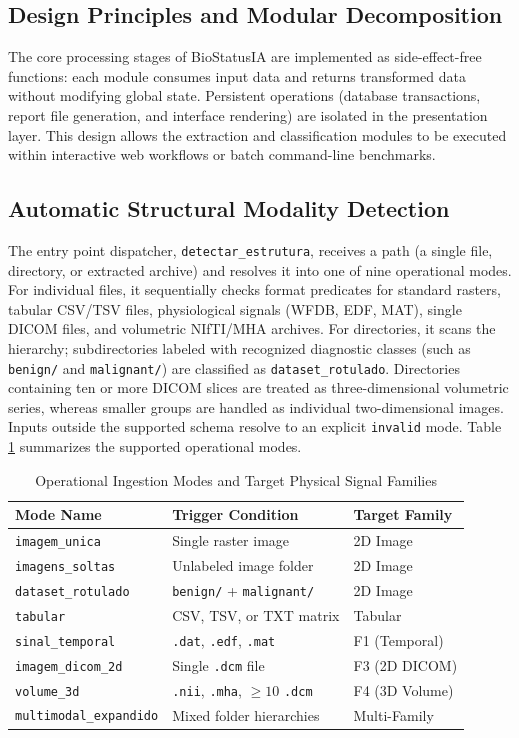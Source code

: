 \documentclass[conference]{IEEEtran}
\begin{document}
\subsection{Design Principles and Modular Decomposition}
The core processing stages of BioStatusIA are implemented as side-effect-free functions: each module consumes input data and returns transformed data without modifying global state. Persistent operations (database transactions, report file generation, and interface rendering) are isolated in the presentation layer. This design allows the extraction and classification modules to be executed within interactive web workflows or batch command-line benchmarks.

\subsection{Automatic Structural Modality Detection}
The entry point dispatcher, \texttt{detectar\_estrutura}, receives a path (a single file, directory, or extracted archive) and resolves it into one of nine operational modes. For individual files, it sequentially checks format predicates for standard rasters, tabular CSV/TSV files, physiological signals (WFDB, EDF, MAT), single DICOM files, and volumetric NIfTI/MHA archives. For directories, it scans the hierarchy; subdirectories labeled with recognized diagnostic classes (such as \texttt{benign/} and \texttt{malignant/}) are classified as \texttt{dataset\_rotulado}. Directories containing ten or more DICOM slices are treated as three-dimensional volumetric series, whereas smaller groups are handled as individual two-dimensional images. Inputs outside the supported schema resolve to an explicit \texttt{invalid} mode. Table \ref{tab:modes} summarizes the supported operational modes.

\begin{table}[htbp]
\caption{Operational Ingestion Modes and Target Physical Signal Families}
\label{tab:modes}
\centering
\small
\begin{tabular}{@{}lll@{}}
\toprule
\textbf{Mode Name} & \textbf{Trigger Condition} & \textbf{Target Family} \\ \midrule
\texttt{imagem\_unica} & Single raster image & 2D Image \\
\texttt{imagens\_soltas} & Unlabeled image folder & 2D Image \\
\texttt{dataset\_rotulado} & \texttt{benign/} + \texttt{malignant/} & 2D Image \\
\texttt{tabular} & CSV, TSV, or TXT matrix & Tabular \\
\texttt{sinal\_temporal} & \texttt{.dat}, \texttt{.edf}, \texttt{.mat} & F1 (Temporal) \\
\texttt{imagem\_dicom\_2d} & Single \texttt{.dcm} file & F3 (2D DICOM) \\
\texttt{volume\_3d} & \texttt{.nii}, \texttt{.mha}, $\ge 10$ \texttt{.dcm} & F4 (3D Volume) \\
\texttt{multimodal\_expandido} & Mixed folder hierarchies & Multi-Family \\ \bottomrule
\end{tabular}
\end{table}
\end{document}
